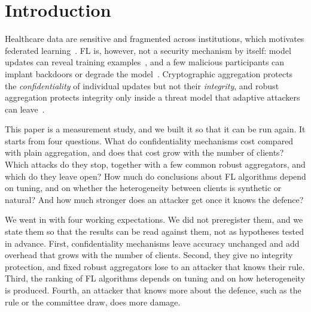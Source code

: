 \documentclass[conference]{IEEEtran}
\begin{document}
\section{Introduction}
Healthcare data are sensitive and fragmented across institutions, which motivates federated learning~\cite{rieke2020,kairouz2021,mcmahan2017}. FL is, however, not a security mechanism by itself: model updates can reveal training examples~\cite{zhu2019,geiping2020,shokri2017}, and a few malicious participants can implant backdoors or degrade the model~\cite{bagdasaryan2020,blanchard2017,fang2020}. Cryptographic aggregation protects the \emph{confidentiality} of individual updates but not their \emph{integrity}, and robust aggregation protects integrity only inside a threat model that adaptive attackers can leave~\cite{baruch2019,shejwalkar2021}.

This paper is a measurement study, and we built it so that it can be run again. It starts from four questions. What do confidentiality mechanisms cost compared with plain aggregation, and does that cost grow with the number of clients? Which attacks do they stop, together with a few common robust aggregators, and which do they leave open? How much do conclusions about FL algorithms depend on tuning, and on whether the heterogeneity between clients is synthetic or natural? And how much stronger does an attacker get once it knows the defence?

We went in with four working expectations. We did not preregister them, and we state them so that the results can be read against them, not as hypotheses tested in advance. First, confidentiality mechanisms leave accuracy unchanged and add overhead that grows with the number of clients. Second, they give no integrity protection, and fixed robust aggregators lose to an attacker that knows their rule. Third, the ranking of FL algorithms depends on tuning and on how heterogeneity is produced. Fourth, an attacker that knows more about the defence, such as the rule or the committee draw, does more damage.
\end{document}
